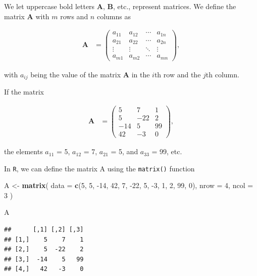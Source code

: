 \documentclass[
]{book}
\newenvironment{Shaded}{\begin{snugshade}}{\end{snugshade}}
\newcommand{\DataTypeTok}[1]{\textcolor[rgb]{0.13,0.29,0.53}{#1}}
\newcommand{\DecValTok}[1]{\textcolor[rgb]{0.00,0.00,0.81}{#1}}
\newcommand{\KeywordTok}[1]{\textcolor[rgb]{0.13,0.29,0.53}{\textbf{#1}}}
\newcommand{\NormalTok}[1]{#1}
\newcommand{\StringTok}[1]{\textcolor[rgb]{0.31,0.60,0.02}{#1}}
\theoremstyle{definition}
\theoremstyle{definition}
\theoremstyle{definition}
\theoremstyle{definition}
\theoremstyle{remark}
\begin{document}
We let uppercase bold letters \(\mathbf{A}\), \(\mathbf{B}\), etc., represent matrices. We define the matrix \(\mathbf{A}\) with \(m\) rows and \(n\) columns as

\[
\begin{aligned}
\mathbf{A} & = \begin{pmatrix} a_{11} & a_{12} & \cdots & a_{1n} \\
a_{21} & a_{22} & \cdots & a_{2n} \\
\vdots & \vdots & \ddots & \vdots \\
a_{m1} & a_{m2} & \cdots & a_{mn}
\end{pmatrix},
\end{aligned}
\]

with \(a_{ij}\) being the value of the matrix \(\mathbf{A}\) in the \(i\)th row and the \(j\)th column.

If the matrix

\[
\begin{aligned}
\mathbf{A} & = \begin{pmatrix} 5 & 7 & 1 \\
5 & -22  & 2 \\
-14 & 5 & 99 \\
42 & -3 & 0\end{pmatrix},
\end{aligned}
\]

the elements \(a_{11}\) = 5, \(a_{12}\) = 7, \(a_{21}\) = 5, and \(a_{33}\) = 99, etc.

In \texttt{R}, we can define the matrix A using the \texttt{matrix()} function

\begin{Shaded}
\begin{Highlighting}[]
\NormalTok{A <-}\StringTok{ }\KeywordTok{matrix}\NormalTok{(}
    \DataTypeTok{data =} \KeywordTok{c}\NormalTok{(}\DecValTok{5}\NormalTok{, }\DecValTok{5}\NormalTok{, }\DecValTok{-14}\NormalTok{, }\DecValTok{42}\NormalTok{, }\DecValTok{7}\NormalTok{, }\DecValTok{-22}\NormalTok{, }\DecValTok{5}\NormalTok{, }\DecValTok{-3}\NormalTok{, }\DecValTok{1}\NormalTok{, }\DecValTok{2}\NormalTok{, }\DecValTok{99}\NormalTok{, }\DecValTok{0}\NormalTok{),}
    \DataTypeTok{nrow =} \DecValTok{4}\NormalTok{,}
    \DataTypeTok{ncol =} \DecValTok{3}
\NormalTok{)}

\NormalTok{A}
\end{Highlighting}
\end{Shaded}

\begin{verbatim}
##      [,1] [,2] [,3]
## [1,]    5    7    1
## [2,]    5  -22    2
## [3,]  -14    5   99
## [4,]   42   -3    0
\end{verbatim}
\end{document}
